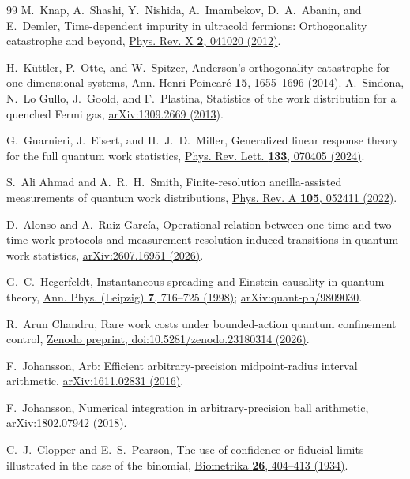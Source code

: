 \documentclass[aps,pra,reprint,superscriptaddress,longbibliography]{revtex4-2}
\begin{document}
\begin{thebibliography}{99}
M.~Knap, A.~Shashi, Y.~Nishida, A.~Imambekov, D.~A.~Abanin,
and E.~Demler,
Time-dependent impurity in ultracold fermions: Orthogonality catastrophe
and beyond,
\href{https://doi.org/10.1103/PhysRevX.2.041020}
{Phys. Rev. X \textbf{2}, 041020 (2012)}.

H.~K\"uttler, P.~Otte, and W.~Spitzer,
Anderson's orthogonality catastrophe for one-dimensional systems,
\href{https://doi.org/10.1007/s00023-013-0287-z}
{Ann. Henri Poincar\'e \textbf{15}, 1655--1696 (2014)}.
A.~Sindona, N.~Lo Gullo, J.~Goold, and F.~Plastina,
Statistics of the work distribution for a quenched Fermi gas,
\href{https://arxiv.org/abs/1309.2669}{arXiv:1309.2669 (2013)}.

G.~Guarnieri, J.~Eisert, and H.~J.~D.~Miller,
Generalized linear response theory for the full quantum work statistics,
\href{https://doi.org/10.1103/PhysRevLett.133.070405}
{Phys. Rev. Lett. \textbf{133}, 070405 (2024)}.

S.~Ali Ahmad and A.~R.~H.~Smith,
Finite-resolution ancilla-assisted measurements of quantum work distributions,
\href{https://doi.org/10.1103/PhysRevA.105.052411}
{Phys. Rev. A \textbf{105}, 052411 (2022)}.

D.~Alonso and A.~Ruiz-Garc\'ia,
Operational relation between one-time and two-time work protocols and
measurement-resolution-induced transitions in quantum work statistics,
\href{https://arxiv.org/abs/2607.16951}{arXiv:2607.16951 (2026)}.

G.~C.~Hegerfeldt,
Instantaneous spreading and Einstein causality in quantum theory,
\href{https://doi.org/10.1002/andp.199851007-817}
{Ann. Phys. (Leipzig) \textbf{7}, 716--725 (1998)};
\href{https://arxiv.org/abs/quant-ph/9809030}{arXiv:quant-ph/9809030}.

R.~Arun Chandru,
Rare work costs under bounded-action quantum confinement control,
\href{https://doi.org/10.5281/zenodo.23180314}
{Zenodo preprint, doi:10.5281/zenodo.23180314 (2026)}.

F.~Johansson,
Arb: Efficient arbitrary-precision midpoint-radius interval arithmetic,
\href{https://arxiv.org/abs/1611.02831}{arXiv:1611.02831 (2016)}.

F.~Johansson,
Numerical integration in arbitrary-precision ball arithmetic,
\href{https://arxiv.org/abs/1802.07942}{arXiv:1802.07942 (2018)}.

C.~J.~Clopper and E.~S.~Pearson,
The use of confidence or fiducial limits illustrated in the case of the binomial,
\href{https://doi.org/10.1093/biomet/26.4.404}
{Biometrika \textbf{26}, 404--413 (1934)}.

\end{thebibliography}
\end{document}
